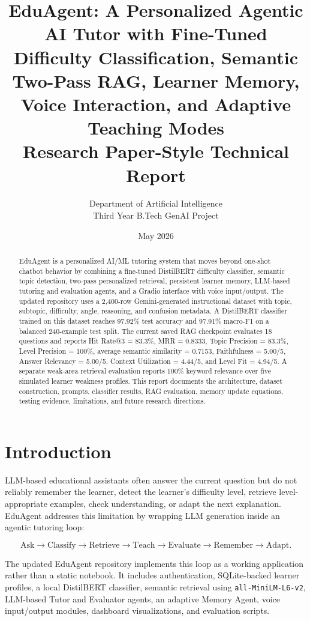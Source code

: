 \documentclass[11pt,a4paper]{article}
\title{\vspace{-1.5cm}\textbf{EduAgent: A Personalized Agentic AI Tutor with Fine-Tuned Difficulty Classification, Semantic Two-Pass RAG, Learner Memory, Voice Interaction, and Adaptive Teaching Modes}\\[0.45em]
\large Research Paper-Style Technical Report}
\author{Department of Artificial Intelligence \\ Third Year B.Tech GenAI Project}
\date{May 2026}
\begin{document}
\maketitle

\begin{abstract}
EduAgent is a personalized AI/ML tutoring system that moves beyond one-shot chatbot behavior by combining a fine-tuned DistilBERT difficulty classifier, semantic topic detection, two-pass personalized retrieval, persistent learner memory, LLM-based tutoring and evaluation agents, and a Gradio interface with voice input/output. The updated repository uses a 2,400-row Gemini-generated instructional dataset with topic, subtopic, difficulty, angle, reasoning, and confusion metadata. A DistilBERT classifier trained on this dataset reaches 97.92\% test accuracy and 97.91\% macro-F1 on a balanced 240-example test split. The current saved RAG checkpoint evaluates 18 questions and reports Hit Rate@3 = 83.3\%, MRR = 0.8333, Topic Precision = 83.3\%, Level Precision = 100\%, average semantic similarity = 0.7153, Faithfulness = 5.00/5, Answer Relevancy = 5.00/5, Context Utilization = 4.44/5, and Level Fit = 4.94/5. A separate weak-area retrieval evaluation reports 100\% keyword relevance over five simulated learner weakness profiles. This report documents the architecture, dataset construction, prompts, classifier results, RAG evaluation, memory update equations, testing evidence, limitations, and future research directions.
\end{abstract}


\tableofcontents
\newpage

\section{Introduction}

LLM-based educational assistants often answer the current question but do not reliably remember the learner, detect the learner's difficulty level, retrieve level-appropriate examples, check understanding, or adapt the next explanation. EduAgent addresses this limitation by wrapping LLM generation inside an agentic tutoring loop:

\[
\text{Ask} \rightarrow \text{Classify} \rightarrow \text{Retrieve} \rightarrow \text{Teach} \rightarrow \text{Evaluate} \rightarrow \text{Remember} \rightarrow \text{Adapt}.
\]

The updated EduAgent repository implements this loop as a working application rather than a static notebook. It includes authentication, SQLite-backed learner profiles, a local DistilBERT classifier, semantic retrieval using \texttt{all-MiniLM-L6-v2}, LLM-based Tutor and Evaluator agents, an adaptive Memory Agent, voice input/output modules, dashboard visualizations, and evaluation scripts.
\end{document}
